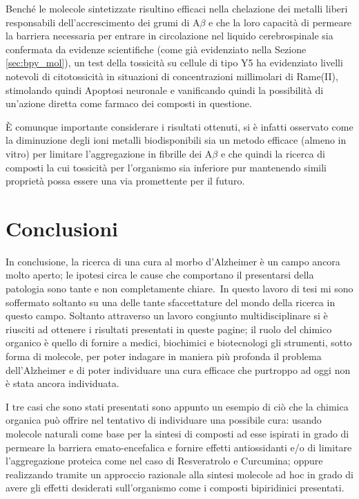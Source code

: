 \documentclass[a4paper, 12pt]{article}
\begin{document}
Benché le molecole sintetizzate risultino efficaci nella chelazione dei metalli liberi responsabili dell’accrescimento dei grumi di A\(\beta\) e che la loro capacità di permeare la barriera necessaria per entrare in circolazione nel liquido cerebrospinale sia confermata da evidenze scientifiche (come già evidenziato nella Sezione \ref{sec:bpy_mol}), un test della tossicità su cellule di tipo Y5 ha evidenziato livelli notevoli di citotossicità in situazioni di concentrazioni millimolari di Rame(II), stimolando quindi Apoptosi neuronale e vanificando quindi la possibilità di un'azione diretta come farmaco dei composti in questione.

È comunque importante considerare i risultati ottenuti, si è infatti osservato come la diminuzione degli ioni metalli biodisponibili sia un metodo efficace (almeno in vitro) per limitare l'aggregazione in fibrille dei A\(\beta\) e che quindi la ricerca di composti la cui tossicità per l'organismo sia inferiore pur mantenendo simili proprietà possa essere una via promettente per il futuro. \autocite{ji_strategic_2017}

\section{Conclusioni}
In conclusione, la ricerca di una cura al morbo d'Alzheimer è un campo ancora molto aperto; le ipotesi circa le cause che comportano il presentarsi della patologia sono tante e non completamente chiare.\ In questo lavoro di tesi mi sono soffermato soltanto su una delle tante sfaccettature del mondo della ricerca in questo campo. Soltanto attraverso un lavoro congiunto multidisciplinare si è riusciti ad ottenere i risultati presentati in queste pagine; il ruolo del chimico organico è quello di fornire a medici, biochimici e biotecnologi gli strumenti, sotto forma di molecole, per poter indagare in maniera più profonda il problema dell'Alzheimer e di poter individuare una cura efficace che purtroppo ad oggi non è stata ancora individuata.

I tre casi che sono stati presentati sono appunto un esempio di ciò che la chimica organica può offrire nel tentativo di individuare una possibile cura: usando molecole naturali come base per la sintesi di composti ad esse ispirati in grado di permeare la barriera emato-encefalica e fornire effetti antiossidanti e/o di limitare l'aggregazione proteica come nel caso di Resveratrolo e Curcumina; oppure realizzando tramite un approccio razionale alla sintesi molecole ad hoc in grado di avere gli effetti desiderati sull'organismo come i composti bipiridinici presentati.
\end{document}
